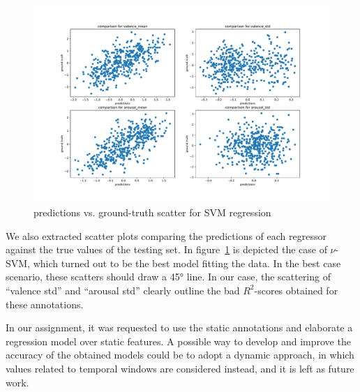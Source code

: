 \begin{figure}
	\centering
	\includegraphics[width=\linewidth]{assets/predictions-scatter.pdf}
	\caption{predictions vs. ground-truth scatter for SVM regression}
	\label{fig:eval-scatter}
\end{figure}

We also extracted scatter plots comparing the predictions of each regressor against the true values of the testing set. In  figure~\ref{fig:eval-scatter} is depicted the case of $\nu$-SVM, which turned out to be the best model fitting the data. In the best case scenario, these scatters should draw a 45° line. In our case, the scattering of ``valence std'' and ``arousal std'' clearly outline the bad $R^2$-scores obtained for these annotations.

In our assignment, it was requested to use the static annotations and elaborate a regression model over static features. A possible way to develop and improve the accuracy of the obtained models could be to adopt a dynamic approach, in which values related to temporal windows are considered instead, and it is left as future work.
